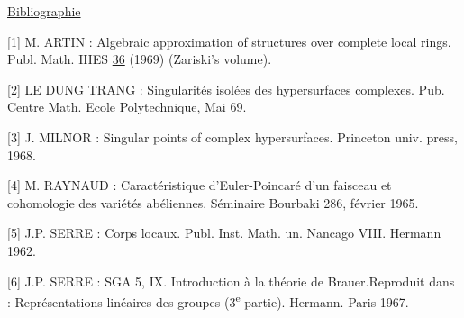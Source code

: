 

\underline{Bibliographie}

[1] M. ARTIN : Algebraic approximation of structures over complete local rings. Publ. Math. IHES \underline{36} (1969) (Zariski's volume).

[2] LE DUNG TRANG : Singularités isolées des hypersurfaces complexes. Pub. Centre Math. Ecole Polytechnique, Mai 69.

[3] J. MILNOR : Singular points of complex hypersurfaces. Princeton univ. press, 1968.

[4] M. RAYNAUD : Caractéristique d'Euler-Poincaré d'un faisceau et cohomologie des variétés abéliennes. Séminaire Bourbaki 286, février 1965.

[5] J.P. SERRE : Corps locaux. Publ. Inst. Math. un. Nancago VIII. Hermann 1962.

[6] J.P. SERRE : SGA 5, IX. Introduction à la théorie de Brauer.Reproduit dans : Représentations linéaires des groupes (3\textsuperscript{e} partie). Hermann. Paris 1967.
